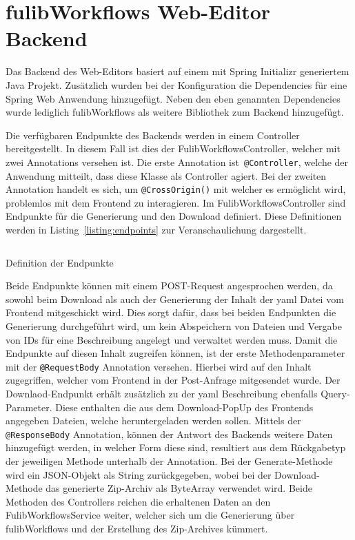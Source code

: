 \section{fulibWorkflows Web-Editor Backend}\label{sec:editor-backend}
Das Backend des Web-Editors basiert auf einem mit Spring Initializr generiertem Java Projekt.
Zusätzlich wurden bei der Konfiguration die Dependencies für eine Spring Web Anwendung hinzugefügt.
Neben den eben genannten Dependencies wurde lediglich fulibWorkflows als weitere Bibliothek zum Backend hinzugefügt.

Die verfügbaren Endpunkte des Backends werden in einem Controller bereitgestellt.
In diesem Fall ist dies der FulibWorkflowsController, welcher mit zwei Annotations versehen ist.
Die erste Annotation ist~\texttt{@Controller}, welche der Anwendung mitteilt, dass diese Klasse als Controller agiert.
Bei der zweiten Annotation handelt es sich, um \texttt{@CrossOrigin()} mit welcher es ermöglicht wird, problemlos mit dem
Frontend zu interagieren.
Im FulibWorkflowsController sind Endpunkte für die Generierung und den Download definiert.
Diese Definitionen werden in Listing~\ref{listing:endpoints} zur Veranschaulichung dargestellt.

\begin{listing}[!ht]
    \inputminted[xleftmargin=20pt,linenos,firstnumber=15]{java}{listings/3.3/Endpoints.java}
    \caption{Definition der Endpunkte}
    \label{listing:endpoints}
\end{listing}

Beide Endpunkte können mit einem POST-Request angesprochen werden, da sowohl beim Download als auch der Generierung der Inhalt der
yaml Datei vom Frontend mitgeschickt wird.
Dies sorgt dafür, dass bei beiden Endpunkten die Generierung durchgeführt wird, um kein Abspeichern von Dateien und Vergabe von IDs für
eine Beschreibung angelegt und verwaltet werden muss.
Damit die Endpunkte auf diesen Inhalt zugreifen können, ist der erste Methodenparameter mit der \texttt{@RequestBody} Annotation versehen.
Hierbei wird auf den Inhalt zugegriffen, welcher vom Frontend in der Post-Anfrage mitgesendet wurde.
Der Downlaod-Endpunkt erhält zusätzlich zu der yaml Beschreibung ebenfalls Query-Parameter.
Diese enthalten die aus dem Download-PopUp des Frontends angegeben Dateien, welche heruntergeladen werden sollen.
Mittels der \texttt{@ResponseBody} Annotation, können der Antwort des Backends weitere Daten hinzugefügt werden, in welcher Form diese
sind, resultiert aus dem Rückgabetyp der jeweiligen Methode unterhalb der Annotation.
Bei der Generate-Methode wird ein JSON-Objekt als String zurückgegeben, wobei bei der Download-Methode das generierte Zip-Archiv als ByteArray verwendet wird.
Beide Methoden des Controllers reichen die erhaltenen Daten an den FulibWorkflowsService weiter, welcher sich um die Generierung über fulibWorkflows
und der Erstellung des Zip-Archives kümmert.

